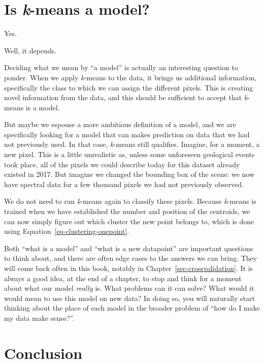 \documentclass[
  letterpaper,
]{scrbook}
\begin{document}
\section{\texorpdfstring{Is \emph{k}-means a
model?}{Is k-means a model?}}\label{is-k-means-a-model}

Yes.

Well, it depends.

Deciding what we mean by ``a model'' is actually an interesting question
to ponder. When we apply \emph{k}-means to the data, it brings us
additional information, specifically the class to which we can assign
the different pixels. This is creating novel information from the data,
and this should be sufficient to accept that \emph{k}-means is a model.

But maybe we espouse a more ambitious definition of a model, and we are
specifically looking for a model that can makes prediction on data that
we had not previously used. In that case, \emph{k}-means still
qualifies. Imagine, for a moment, a new pixel. This is a little
unrealistic as, unless some unforeseen geological events took place, all
of the pixels we could describe today for this dataset already existed
in 2017. But imagine we changed the bounding box of the scene: we now
have spectral data for a few thousand pixels we had not previously
observed.

We do not need to run \emph{k}-means again to classify these pixels.
Because \emph{k}-means is trained when we have established the number
and position of the centroids, we can now simply figure out which
cluster the new point belongs to, which is done using
Equation~\ref{eq-clustering-onepoint}.

Both ``what is a model'' and ``what is a new datapoint'' are important
questions to think about, and there are often edge cases to the answers
we can bring. They will come back often in this book, notably in
Chapter~\ref{sec-crossvalidation}. It is always a good idea, at the end
of a chapter, to stop and think for a moment about what our model
\emph{really} is. What problems can it can solve? What would it would
mean to use this model on new data? In doing so, you will naturally
start thinking about the place of each model in the broader problem of
``how do I make my data make sense?''.

\section{Conclusion}\label{conclusion}
\end{document}

